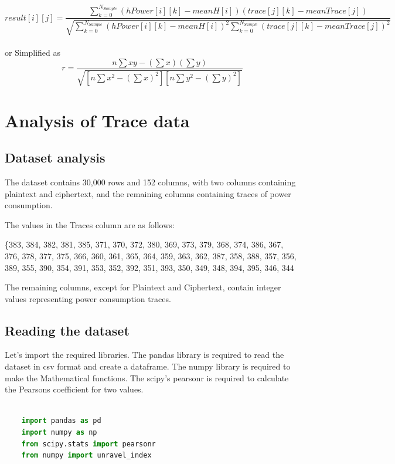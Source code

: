\documentclass[12pt, letterpaper, oneside]{report}
\begin{document}
$$result[i][j] = \frac{\sum_{k=0}^{N_{Sample}} (hPower[i][k] - meanH[i])(trace[j][k] - meanTrace[j])}{\sqrt{\sum_{k=0}^{N_{Sample}} (hPower[i][k] - meanH[i])^2 \sum_{k=0}^{N_{Sample}} (trace[j][k] - meanTrace[j])^2}}$$ \\

or Simplified as \\

$$r = \frac{n \sum xy - (\sum x)(\sum y)}{\sqrt{[n \sum x^2 - (\sum x)^2][n \sum y^2 - (\sum y)^2]}}$$

\chapter{Analysis of Trace data}

\section{Dataset analysis}
The dataset contains 30,000 rows and 152 columns, with two columns containing plaintext and ciphertext, and the remaining columns containing traces of power consumption.

The values in the Traces column are as follows:

\{383, 384, 382, 381, 385, 371, 370, 372, 380, 369, 373, 379, 368, 374, 386, 367, 376, 378, 377, 375, 366, 360, 361, 365, 364, 359, 363, 362, 387, 358, 388, 357, 356, 389, 355, 390, 354, 391, 353, 352, 392, 351, 393, 350, 349, 348, 394, 395, 346, 344

The remaining columns, except for Plaintext and Ciphertext, contain integer values representing power consumption traces.


\section{Reading the dataset}

Let's import the required libraries. The pandas library is required to read the dataset in csv format and create a dataframe. The numpy library is required to make the Mathematical functions. The 
scipy's pearsonr is required to calculate the Pearsons coeﬃcient for two values.\\


\begin{lstlisting}[language=Python, caption=Imports the libraries]

    import pandas as pd
    import numpy as np
    from scipy.stats import pearsonr
    from numpy import unravel_index
\end{lstlisting}
\end{document}

